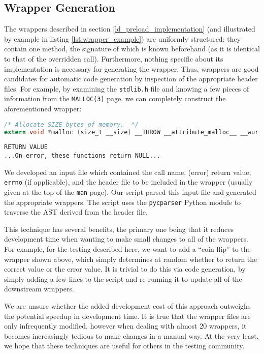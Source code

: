 \subsection{Wrapper Generation}
The wrappers described in section \ref{ld_preload_implementation} (and illustrated by example in listing \ref{lst:wrapper_example}) are uniformly structured: they contain one method, the signature of which is known beforehand (as it is identical to that of the overridden call). Furthermore, nothing specific about its implementation is necessary for generating the wrapper. Thus, wrappers are good candidates for automatic code generation by inspection of the appropriate header files. For example, by examining the \texttt{stdlib.h} file and knowing a few pieces of information from the \texttt{MALLOC(3)} page, we can completely construct the aforementioned wrapper:

\begin{lstlisting}[caption=Excerpt from \texttt{/usr/include/stdlib.h}, language=C]
/* Allocate SIZE bytes of memory.  */
extern void *malloc (size_t __size) __THROW __attribute_malloc__ __wur;
\end{lstlisting}

\begin{lstlisting}[caption=Excerpt from \texttt{MALLOC(3)}]
RETURN VALUE
...On error, these functions return NULL...
\end{lstlisting}

We developed an input file which contained the call name, (error) return value, \texttt{errno} (if applicable), and the header file to be included in the wrapper (usually given at the top of the \texttt{man} page). Our script parsed this input file and generated the appropriate wrappers. The script uses the \texttt{pycparser} Python module \cite{pycparser} to traverse the AST derived from the header file.

This technique has several benefits, the primary one being that it reduces development time when wanting to make small changes to all of the wrappers. For example, for the testing described here, we want to add a ``coin flip'' to the wrapper shown above, which simply determines at random whether to return the correct value or the error value. It is trivial to do this via code generation, by simply adding a few lines to the script and re-running it to update all of the downstream wrappers.

We are unsure whether the added development cost of this approach outweighs the potential speedup in development time. It is true that the wrapper files are only infrequently modified, however when dealing with almost 20 wrappers, it becomes increasingly tedious to make changes in a manual way. At the very least, we hope that these techniques are useful for others in the testing community.